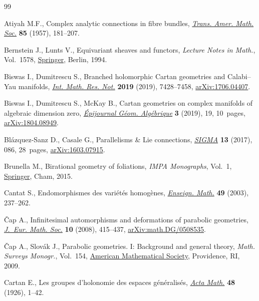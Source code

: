 \begin{thebibliography}{99}
\footnotesize\itemsep=0pt

Atiyah M.F., Complex analytic connections in fibre bundles, \href{https://doi.org/10.2307/1992969}{\textit{Trans.
 Amer. Math. Soc.}} \textbf{85} (1957), 181--207.

Bernstein J., Lunts V., Equivariant sheaves and functors, \textit{Lecture Notes
 in Math.}, Vol.~1578, \href{https://doi.org/10.1007/BFb0073549}{Springer}, Berlin, 1994.

Biswas I., Dumitrescu S., Branched holomorphic {C}artan geometries and
 {C}alabi--{Y}au manifolds, \href{https://doi.org/10.1093/imrn/rny003}{\textit{Int. Math. Res. Not.}} \textbf{2019}
 (2019), 7428--7458, \href{https://arxiv.org/abs/1706.04407}{arXiv:1706.04407}.

Biswas I., Dumitrescu S., McKay B., Cartan geometries on complex manifolds of
 algebraic dimension zero, \href{https://doi.org/10.46298/epiga.2019.volume3.4460}{\textit{\'Epijournal G\'eom. Alg\'ebrique}}
 \textbf{3} (2019), 19, 10~pages, \href{https://arxiv.org/abs/1804.08949}{arXiv:1804.08949}.

Bl\'azquez-Sanz D., Casale G., Parallelisms \& {L}ie connections,
  \href{https://doi.org/10.3842/SIGMA.2017.086}{\textit{SIGMA}} \textbf{13} (2017), 086, 28~pages, \href{https://arxiv.org/abs/1603.07915}{arXiv:1603.07915}.

Brunella M., Birational geometry of foliations, \textit{IMPA Monographs},
 Vol.~1, \href{https://doi.org/10.1007/978-3-319-14310-1}{Springer}, Cham, 2015.

Cantat S., Endomorphismes des vari\'et\'es homog\`enes, \href{https://doi.org/10.1007/978-3-319-14310-1}{\textit{Enseign. Math.}}
 \textbf{49} (2003), 237--262.

\v{C}ap A., Infinitesimal automorphisms and deformations of parabolic
 geometries, \href{https://doi.org/10.4171/JEMS/116}{\textit{J.~Eur. Math. Soc.}} \textbf{10} (2008), 415--437,
 \href{https://arxiv.org/abs/math.DG/0508535}{arXiv:math.DG/0508535}.

\v{C}ap A., Slov\'ak J., Parabolic geometries. {I}: Background and general
 theory, \textit{Math. Surveys Monogr.}, Vol.~154, \href{https://doi.org/10.1090/surv/154}{American Mathematical Society}, Providence, RI, 2009.

Cartan E., Les groupes d'holonomie des espaces g\'en\'eralis\'es,  \href{https://doi.org/10.1007/BF02629755}{\textit{Acta
 Math.}} \textbf{48} (1926), 1--42.


\end{thebibliography}
